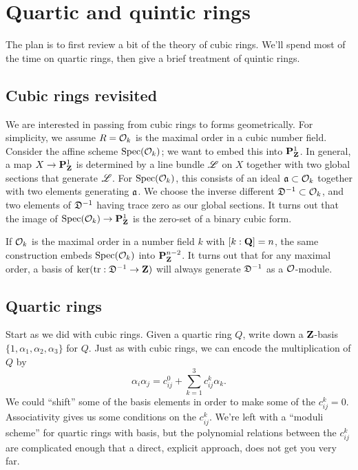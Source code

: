 
\section{Quartic and quintic rings}\label{sec:wood-ii}





The plan is to first review a bit of the theory of cubic rings. We'll spend 
most of the time on quartic rings, then give a brief treatment of quintic 
rings. 





\subsection{Cubic rings revisited}

We are interested in passing from cubic rings to forms geometrically. 
For simplicity, we assume $R=\mathcal{O}_k$ is the maximal order in a cubic number 
field. Consider the affine scheme $\operatorname{Spec}(\mathcal{O}_k)$; we want to embed this 
into $\mathbf{P}_{\mathbf{Z}}^1$. In general, a map $X\to \mathbf{P}_{\mathbf{Z}}^1$ is determined by a line 
bundle $\mathscr{L}$ on $X$ together with two global sections that generate $\mathscr{L}$. 
For $\operatorname{Spec}(\mathcal{O}_k)$, this consists of an ideal $\mathfrak{a}\subset \mathcal{O}_k$ together 
with two elements generating $\mathfrak{a}$. We choose the inverse different 
$\mathfrak{D}^{-1}\subset \mathcal{O}_k$, and two elements of $\mathfrak{D}^{-1}$ having trace zero as 
our global sections. 
It turns out that the image of $\operatorname{Spec}(\mathcal{O}_k) \to \mathbf{P}_{\mathbf{Z}}^1$ is the zero-set 
of a binary cubic form. 

If $\mathcal{O}_k$ is the maximal order in a number field $k$ with $[k:\mathbf{Q}]=n$, the 
same construction embeds $\operatorname{Spec}(\mathcal{O}_k)$ into $\mathbf{P}_{\mathbf{Z}}^{n-2}$. 
It turns out that for any maximal order, a basis of 
$\ker(\operatorname{tr}:\mathfrak{D}^{-1} \to \mathbf{Z})$ will always generate $\mathfrak{D}^{-1}$ as a 
$\mathcal{O}$-module. 





\subsection{Quartic rings}

Start as we did with cubic rings. Given a quartic ring $Q$, write down a 
$\mathbf{Z}$-basis $\{1,\alpha_1,\alpha_2,\alpha_3\}$ for $Q$. Just as with cubic 
rings, we can encode the multiplication of $Q$ by  
\[
  \alpha_i \alpha_j = c_{i j}^0 + \sum_{k=1}^3 c_{i j}^k \alpha_k .
\]
We could ``shift'' some of the basis elements in order to make some of the 
$c_{i j}^k=0$. Associativity gives us some conditions on the 
$c_{i j}^k$. We're left with a ``moduli scheme'' for quartic rings with 
basis, but the polynomial relations between the $c_{i j}^k$ are complicated 
enough that a direct, explicit approach, does not get you very far. 

